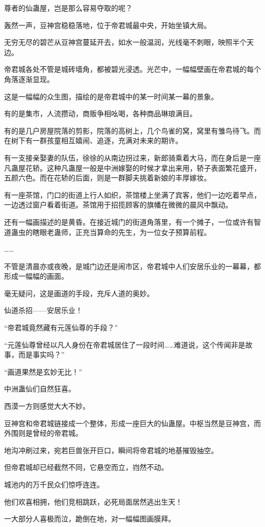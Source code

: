 \begin{this_body}
尊者的仙蛊屋，岂是那么容易夺取的呢？

轰然一声，豆神宫稳稳落地，位于帝君城最中央，开始坐镇大局。

无穷无尽的碧芒从豆神宫蔓延开去，如水一般温润，光线毫不刺眼，映照半个天边。

帝君城各处不管是城砖墙角，都被碧光浸透。光芒中，一幅幅壁画在帝君城的每个角落逐渐显现。

这是一幅幅的众生图，描绘的是帝君城中的某一时间某一幕的景象。

有的是集市，人流攒动，商贩争相吆喝，各种商品琳琅满目。

有的是几户房屋院落的剪影，院落的高树上，几个鸟雀的窝，窝里有雏鸟待飞。而在树下有一群孩童相互嬉闹、追逐，充满对未来的期许。

有一支接亲娶妻的队伍，徐徐的从南边拐过来，新郎骑乘着大马，而在身后是一座凡蛊屋花轿。这种凡蛊屋一般是中洲嫁娶的时候才拿出来用，轿子表面繁花盛开，五颜六色。而在花轿的后面，则是一群脚夫挑着新娘的丰厚嫁妆。

有一座茶馆，门口的街道上行人如织，茶馆楼上坐满了宾客，他们一边吃着早点，一边透过窗户看着街道。茶馆用于招揽顾客的旗幡在微微的晨风中飘动。

还有一幅画描述的是黄昏。在接近城门的街道角落里，有一个摊子，一位或许有智道蛊虫的瞎眼老蛊师，正充当算命的先生，为一位女子预算前程。

……

不管是清晨亦或夜晚，是城门边还是闹市区，帝君城中人们安居乐业的一幕幕，都形成一幅幅的画面。

毫无疑问，这是画道的手段，充斥人道的奥妙。

仙道杀招——安居乐业！

“帝君城竟然藏有元莲仙尊的手段？”

“元莲仙尊曾经以凡人身份在帝君城居住了一段时间……难道说，这个传闻非是故事，而是事实吗？”

“画道果然是玄妙无比！”

中洲蛊仙们自然狂喜。

西漠一方则感觉大大不妙。

豆神宫和帝君城链接成一个整体，形成一座巨大的仙蛊屋。中枢当然是豆神宫，而外围则是曾经的帝君城。

地沟冲刷过来，宛若巨兽张开巨口，瞬间将帝君城的地基摧毁抽空。

但帝君城却已经截然不同，它悬空而立，岿然不动。

城池内的万千民众们惊呼连连。

他们欢喜相拥，他们竞相跳跃，必死局面居然逃出生天！

一大部分人喜极而泣，跪倒在地，对一幅幅图画膜拜。


\end{this_body}
